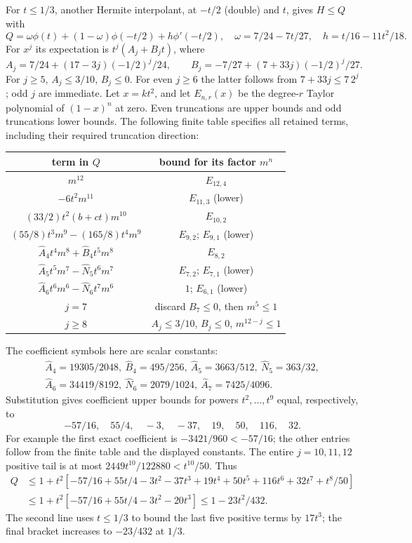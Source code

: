 For $t\le1/3$, another Hermite interpolant, at $-t/2$ (double) and $t$,
gives $H\le Q$ with
\[
 Q=\omega\phi(t)+(1-\omega)\phi(-t/2)+h\phi'(-t/2),\quad
 \omega=7/24-7t/27,\quad h=t/16-11t^2/18.
\]
For $x^j$ its expectation is $t^j(A_j+B_jt)$, where
\[
 A_j=7/24+(17-3j)(-1/2)^j/24,\qquad
 B_j=-7/27+(7+33j)(-1/2)^j/27.
\]
For $j\ge5$, $A_j\le3/10$, $B_j\le0$.
For even $j\ge6$ the latter follows from $7+33j\le7\,2^j$;
odd $j$ are immediate. Let $x=kt^2$, and let $E_{n,r}(x)$ be the
degree-$r$ Taylor polynomial of $(1-x)^n$ at zero.
Even truncations are upper bounds and odd truncations lower bounds.
The following finite table specifies all retained terms, including their
required truncation direction:
\begin{center}\small
\begin{tabular}{@{}cc@{}}\toprule
term in $Q$&bound for its factor $m^n$\\\midrule
$m^{12}$&$E_{12,4}$\\
$-6t^2m^{11}$&$E_{11,3}$ (lower)\\
$(33/2)t^2(b+ct)m^{10}$&$E_{10,2}$\\
$(55/8)t^3m^9-(165/8)t^4m^9$&$E_{9,2}$; $E_{9,1}$ (lower)\\
$\widehat A_4t^4m^8+\widehat B_4t^5m^8$&$E_{8,2}$\\
$\widehat A_5t^5m^7-\widehat N_5t^6m^7$&$E_{7,2}$; $E_{7,1}$ (lower)\\
$\widehat A_6t^6m^6-\widehat N_6t^7m^6$&$1$; $E_{6,1}$ (lower)\\
$j=7$&discard $B_7\le0$, then $m^5\le1$\\
$j\ge8$&$A_j\le3/10$, $B_j\le0$, $m^{12-j}\le1$\\\bottomrule
\end{tabular}
\end{center}
The coefficient symbols here are scalar constants:
\begin{gather*}
 \widehat A_4=19305/2048,\ \widehat B_4=495/256,\ \widehat A_5=3663/512,\ \widehat N_5=363/32,\\
 \widehat A_6=34419/8192,\ \widehat N_6=2079/1024,\ \widehat A_7=7425/4096.
\end{gather*}
Substitution gives coefficient upper bounds for powers $t^2,\ldots,t^9$
equal, respectively, to
\[
 -57/16,\quad55/4,\quad-3,\quad-37,\quad19,\quad50,\quad116,\quad32.
\]
For example the first exact coefficient is $-3421/960<-57/16$;
the other entries follow from the finite table and the displayed constants.
The entire $j=10,11,12$ positive tail is at most
$2449t^{10}/122880<t^{10}/50$.
Thus
\begin{align*}
 Q&\le1+t^2[-57/16+55t/4-3t^2-37t^3
                          +19t^4+50t^5+116t^6+32t^7+t^8/50]\\
 &\le1+t^2[-57/16+55t/4-3t^2-20t^3]
 \le1-23t^2/432.
\end{align*}
The second line uses $t\le1/3$ to bound the last five positive terms by
$17t^3$; the final bracket increases to $-23/432$ at $1/3$.

